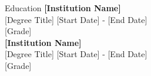 \begin{rSection}{Education}
{\bf [Institution Name]} \\ 
{[Degree Title]} \hfill
{[Start Date] - [End Date]} \\\hfill 
{[Grade]}
\vspace{0.25cm}\\
{\bf [Institution Name]} \\ 
{[Degree Title]} \hfill
{[Start Date] - [End Date]} \\\hfill 
{[Grade]}
\end{rSection}